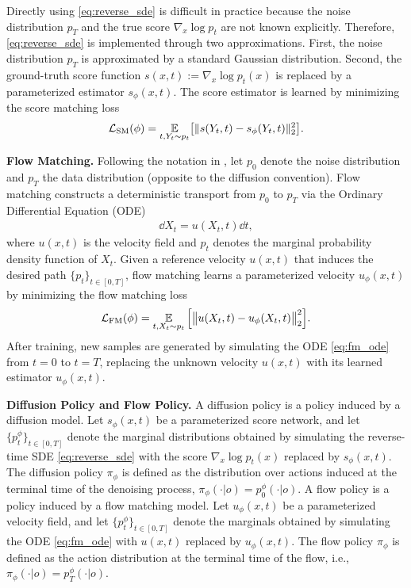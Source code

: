 Directly using \eqref{eq:reverse_sde} is difficult
in practice because the noise distribution $p_T$
and the true score $\nabla_x \log p_t$ are not
known explicitly.
Therefore, \eqref{eq:reverse_sde} is implemented
through two approximations.
First, the noise distribution $p_T$ is approximated
by a standard Gaussian distribution.
Second, the ground-truth score function
$s(x,t) := \nabla_x \log p_t(x)$
is replaced by a parameterized estimator
$s_\phi(x,t)$.
The score estimator is learned by minimizing
the score matching loss
\begin{align}
\label{eq:score_matching}
    \mathcal{L}_{\mathrm{SM}}(\phi)
    =
    \operatorname*{{\mathbb{E}}}_{t, Y_t \sim p_t}
    \bigl[
        \|s(Y_t,t) - s_\phi(Y_t,t)\|_2^2
    \bigr].
\end{align}


\textbf{Flow Matching.}
Following the notation in \cite{lipman2024flow}, let $p_0$ denote the noise distribution and $p_T$ the data distribution (opposite to the diffusion convention).
Flow matching constructs a deterministic transport from $p_0$ to $p_T$ via the Ordinary Differential Equation (ODE)
\begin{align}
\label{eq:fm_ode}
    \dd X_t = u(X_t,t)\dd t,
\end{align}
where $u(x,t)$ is the velocity field and $p_t$ denotes the marginal probability density function of $X_t$.
Given a reference velocity $u(x,t)$ that induces the desired path $\{p_t\}_{t\in[0,T]}$, flow matching learns a parameterized velocity $u_\phi(x,t)$ by minimizing
the flow matching loss
\begin{align}
\label{eq:flow_matching}
    \mathcal{L}_{\mathrm{FM}}(\phi)
    =
    \operatorname*{{\mathbb{E}}}_{t, X_t \sim p_t}
    \Big[\big\| u(X_t,t) - u_\phi(X_t,t)\big\|_2^2\Big].
\end{align}
After training, new samples are generated by simulating the ODE \eqref{eq:fm_ode} from $t=0$ to $t=T$, replacing the unknown velocity $u(x,t)$ with its learned estimator $u_\phi(x,t)$.


\textbf{Diffusion Policy and Flow Policy.}
A diffusion policy \cite{chi2025diffusion} is a policy induced by a diffusion model.
Let $s_\phi(x,t)$ be a parameterized score network, and let
$\{p_t^\phi\}_{t\in[0,T]}$ denote the marginal distributions obtained by
simulating the reverse-time SDE \eqref{eq:reverse_sde} with the score
$\nabla_x \log p_t(x)$ replaced by $s_\phi(x,t)$.
The diffusion policy $\pi_\phi$ is defined as the distribution over actions induced at the terminal time of the denoising process,
$\pi_\phi(\cdot|o) = p_0^\phi(\cdot|o)$.
A flow policy \cite{black2024pi,intelligence2025pi} is a policy induced by a flow matching model.
Let $u_\phi(x,t)$ be a parameterized velocity field, and let
$\{p_t^\phi\}_{t\in[0,T]}$ denote the marginals obtained by simulating the ODE \eqref{eq:fm_ode} with $u(x,t)$ replaced by $u_\phi(x,t)$.
The flow policy $\pi_\phi$ is defined as the action distribution at the terminal time of the flow, i.e.,
$\pi_\phi(\cdot|o)=p_T^\phi(\cdot|o)$.

